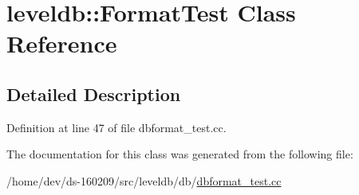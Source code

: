 \hypertarget{classleveldb_1_1_format_test}{}\section{leveldb\+:\+:Format\+Test Class Reference}
\label{classleveldb_1_1_format_test}


\subsection{Detailed Description}


Definition at line 47 of file dbformat\+\_\+test.\+cc.



The documentation for this class was generated from the following file\+:\begin{DoxyCompactItemize}
\item 
/home/dev/ds-\/160209/src/leveldb/db/\hyperlink{dbformat__test_8cc}{dbformat\+\_\+test.\+cc}\end{DoxyCompactItemize}
